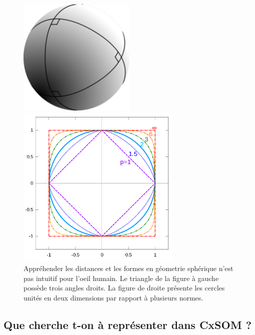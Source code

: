 \begin{figure}
\begin{minipage}{0.5\textwidth}
\centering\includegraphics[width=0.5\textwidth]{sphere.png}
\end{minipage}
\begin{minipage}{0.5\textwidth}
\centering\includegraphics[width=0.7\textwidth]{norm.png}
\end{minipage}
\label{fig:non_eucl}
\caption{Appréhender les distances et les formes en géometrie sphérique n'est pas intuitif pour l'oeil humain. Le triangle de la figure à gauche possède trois angles droits. La figure de droite présente les cercles unités en deux dimensions par rapport à plusieurs normes.}
\end{figure}




\subsection{Que cherche t-on à représenter dans CxSOM ?}

